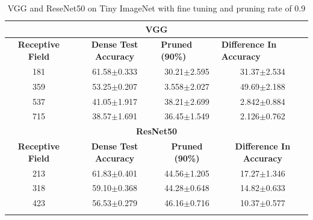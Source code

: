\begin{table}[H]
  \centering
\begin{tabular}{@{}cccc@{}}
\toprule
\multicolumn{4}{c}{\textbf{VGG}}                                                                                                                                  \\ \midrule
\textbf{Receptive Field} & \textbf{Dense Test Accuracy} & \multicolumn{1}{l}{\textbf{Pruned (90\%)}} & \multicolumn{1}{l}{\textbf{Difference In Accuracy}} \\ \midrule
181                      & 61.58$\pm$0.333              & 30.21$\pm$2.595                                   & 31.37$\pm$2.534                                     \\
359                      & 53.25$\pm$0.207              & 3.558$\pm$2.027                                   & 49.69$\pm$2.188                                     \\
537                      & 41.05$\pm$1.917              & 38.21$\pm$2.699                                   & 2.842$\pm$0.884                                     \\
715                      & 38.57$\pm$1.691              & 36.45$\pm$1.549                                   & 2.126$\pm$0.762                                     \\ \midrule
\multicolumn{4}{c}{\textbf{ResNet50}}                                                                                                                             \\ \midrule
\textbf{Receptive Field} & \textbf{Dense Test Accuracy} & \textbf{Pruned (90\%)}                     & \textbf{Difference In Accuracy}                     \\
213                      & 61.83$\pm$0.401              & 44.56$\pm$1.205                                   & 17.27$\pm$1.346                                     \\
318                      & 59.10$\pm$0.368              & 44.28$\pm$0.648                                   & 14.82$\pm$0.633                                     \\
423                      & 56.53$\pm$0.279              & 46.16$\pm$0.716                                   &
10.37$\pm$0.577                                     \\ \bottomrule \\
\end{tabular}
\caption{VGG and ReseNet50 on Tiny ImageNet with fine tuning and pruning rate of 0.9}
\label{tab:cifar10 fine tuning pruning rate 09}
\end{table}

